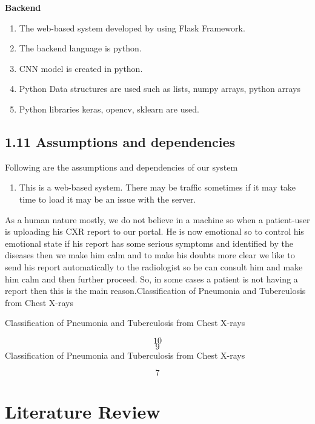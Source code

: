 \documentclass{article} %
\begin{document}
\noindent \textbf{Backend}\textit{}

\begin{enumerate}
\item \textit{ }The web-based system developed by using Flask Framework.

\item  The backend language is python.

\item  CNN model is created in python.

\item  Python Data structures are used such as lists, numpy arrays, python arrays

\item  Python libraries keras, opencv, sklearn are used.
\end{enumerate}

\noindent 
\subsection{1.11 Assumptions and dependencies}

\noindent Following are the assumptions and dependencies of our system

\begin{enumerate}
\item  This is a web-based system. There may be traffic sometimes if it may take time to load it may be an issue with the server.
\end{enumerate}

 As a human nature mostly, we do not believe in a machine so when a patient-user is uploading his CXR report to our portal. He is now emotional so to control his emotional state if his report has some serious symptoms and identified by the diseases then we make him calm and to make his doubts more clear we like to send his report automatically to the radiologist so he can consult him and make him calm and then further proceed. So, in some cases a patient is not having a report then this is the main reason.Classification of Pneumonia and Tuberculosis from Chest X-rays

\noindent 

\noindent Classification of Pneumonia and Tuberculosis from Chest X-rays

\noindent 
\[10\] 
\[9\] 
Classification of Pneumonia and Tuberculosis from Chest X-rays

\noindent 
\[7\] 
\textbf{}


\section{ Literature Review}
\end{document}
